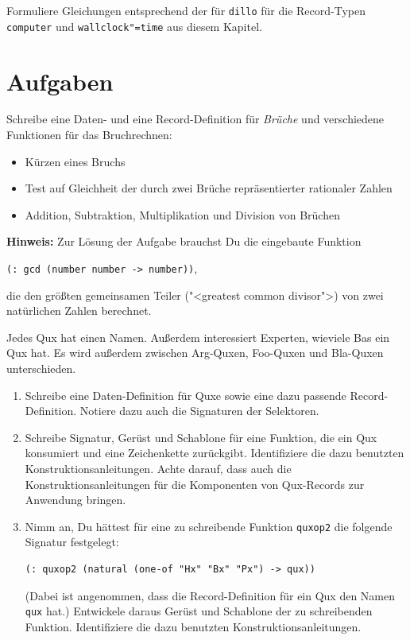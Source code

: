 \begin{aufgabe}
  Formuliere Gleichungen entsprechend der für \texttt{dillo} für die
  Record-Typen \texttt{computer} und \texttt{wallclock"=time} aus
  diesem Kapitel.
\end{aufgabe}

\section*{Aufgaben}

\begin{aufgabe}
  Schreibe eine Daten- und eine
  Record-Definition für \textit{Brüche} und verschiedene Funktionen
  für das Bruchrechnen:
  \begin{itemize}
  \item Kürzen eines Bruchs
  \item Test auf Gleichheit der durch zwei Brüche repräsentierter
    rationaler Zahlen
  \item Addition, Subtraktion, Multiplikation und Division von
    Brüchen
  \end{itemize}

  \textbf{Hinweis:} Zur Lösung der Aufgabe brauchst Du die eingebaute
  Funktion
  \begin{center}
    \texttt{(: gcd (number number -> number))},
  \end{center}
  die den größten gemeinsamen Teiler ("<greatest common divisor">) von
  zwei natürlichen Zahlen berechnet.

\end{aufgabe}

\begin{aufgabe}

  Jedes Qux hat einen Namen.  Außerdem interessiert
  Experten, wieviele Bas ein Qux hat.  Es wird außerdem zwischen
  Arg-Quxen, Foo-Quxen und Bla-Quxen unterschieden.
  \begin{enumerate}
  \item Schreibe eine Daten-Definition für Quxe sowie eine dazu
    passende Record-Definition. Notiere dazu auch die Signaturen der
    Selektoren.
  \item Schreibe Signatur, Gerüst und Schablone für eine Funktion,
    die ein Qux konsumiert und eine Zeichenkette zurückgibt.
    Identifiziere die dazu benutzten Konstruktionsanleitungen.
    Achte darauf, dass auch die Konstruktionsanleitungen für die
    Komponenten von Qux-Records zur Anwendung bringen.
  \item Nimm an, Du hättest für eine zu schreibende Funktion
    \texttt{quxop2} die folgende Signatur festgelegt:
\begin{verbatim}
(: quxop2 (natural (one-of "Hx" "Bx" "Px") -> qux))
\end{verbatim}
    (Dabei ist angenommen, dass die Record-Definition für ein Qux
    den Namen \texttt{qux} hat.) Entwickele daraus Gerüst und
    Schablone der zu schreibenden Funktion.  Identifiziere die dazu
    benutzten Konstruktionsanleitungen.
  \end{enumerate}

\end{aufgabe}

